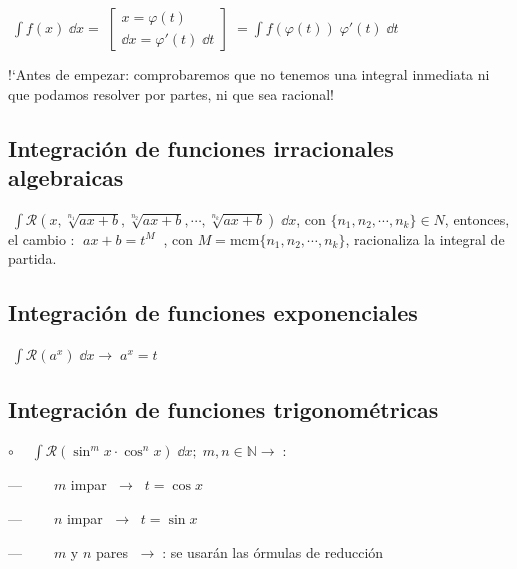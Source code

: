 {\vspace{3mm}
\centerline{ $\boxed{ \displaystyle \; \int f(x) \; \dd x= \; \left[ \begin{matrix} x=\varphi (t) \\ \dd x = \varphi'(t)\; \dd t  \end{matrix} \right] \; =\displaystyle \int f(\varphi(t))\; \varphi'(t)\; \dd t \; }$ }

\vspace{3mm}

!`Antes de empezar: comprobaremos que no tenemos una integral inmediata ni que podamos resolver por partes, ni que sea racional!

\subsection{Integración de funciones irracionales algebraicas}

$ \displaystyle \; \int \mathcal {R} \left(x, \sqrt[n_1]{ax+b} ,\sqrt[n_2]{ax+b}, \cdots , \sqrt[n_k]{ax+b} \right)\; \dd x$,
con $\{n_1, n_2, \cdots, n_k\} \in N$, 
entonces, el cambio :  $ \boxed{\; ax+b=t^M\; } \; $, 
con $M=\text{mcm} \{n_1, n_2, \cdots, n_k\}$, racionaliza la integral de partida.

\subsection{Integración de funciones exponenciales}

$ \displaystyle \; \int \mathcal {R}(a^x)\; \dd x \to \boxed{ \; a^x=t \; } $

\subsection{Integración de funciones trigonométricas}

$\circ \quad  \displaystyle \; \int \mathcal {R} (\sin^m x \cdot \cos^n x)\; \dd x ; \; m,n\in \mathbb N \to \; $:

\hspace{10mm} $ \text{---} \qquad   \; m$ impar $\; \to \;  \boxed{ \; t=\cos x\; } $ 

\hspace{10mm} $ \text{---} \qquad   \; n$ impar $\; \to \;  \boxed{ \; t=\sin x\; } $ 

\hspace{10mm} $ \text{---} \qquad   \; m$  y $n$ pares $\; \to \; $: se usarán las órmulas de reducción

}
